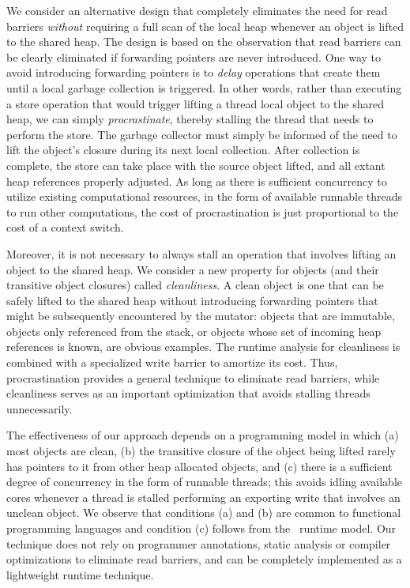 We consider an alternative design that completely eliminates the need for read
barriers \emph{without} requiring a full scan of the local heap whenever an
object is lifted to the shared heap.  The design is based on the observation
that read barriers can be clearly eliminated if forwarding pointers are never
introduced.  One way to avoid introducing forwarding pointers is to
\emph{delay} operations that create them until a local garbage collection is
triggered.  In other words, rather than executing a store operation that would
trigger lifting a thread local object to the shared heap, we can simply
\emph{procrastinate}, thereby stalling the thread that needs to perform the
store.  The garbage collector must simply be informed of the need to lift the
object's closure during its next local collection. After collection is
complete, the store can take place with the source object lifted, and all
extant heap references properly adjusted.  As long as there is sufficient
concurrency to utilize existing computational resources, in the form of
available runnable threads to run other computations, the cost of
procrastination is just proportional to the cost of a context switch.

Moreover, it is not necessary to always stall an operation that involves
lifting an object to the shared heap.  We consider a new property for objects
(and their transitive object closures) called \emph{cleanliness}.  A clean
object is one that can be safely lifted to the shared heap without introducing
forwarding pointers that might be subsequently encountered by the mutator:
objects that are immutable, objects only referenced from the stack, or objects
whose set of incoming heap references is known, are obvious examples.  The
runtime analysis for cleanliness is combined with a specialized write barrier
to amortize its cost.  Thus, procrastination provides a general technique to
eliminate read barriers, while cleanliness serves as an important optimization
that avoids stalling threads unnecessarily.

The effectiveness of our approach depends on a programming model in which (a)
most objects are clean, (b) the transitive closure of the object being lifted
rarely has pointers to it from other heap allocated objects, and (c) there is a
sufficient degree of concurrency in the form of runnable threads; this avoids
idling available cores whenever a thread is stalled performing an exporting
write that involves an unclean object.  We observe that conditions (a) and (b)
are common to functional programming languages and condition (c) follows from
the \acml\ runtime model. Our technique does not rely on programmer
annotations, static analysis or compiler optimizations to eliminate read
barriers, and can be completely implemented as a lightweight runtime technique.

